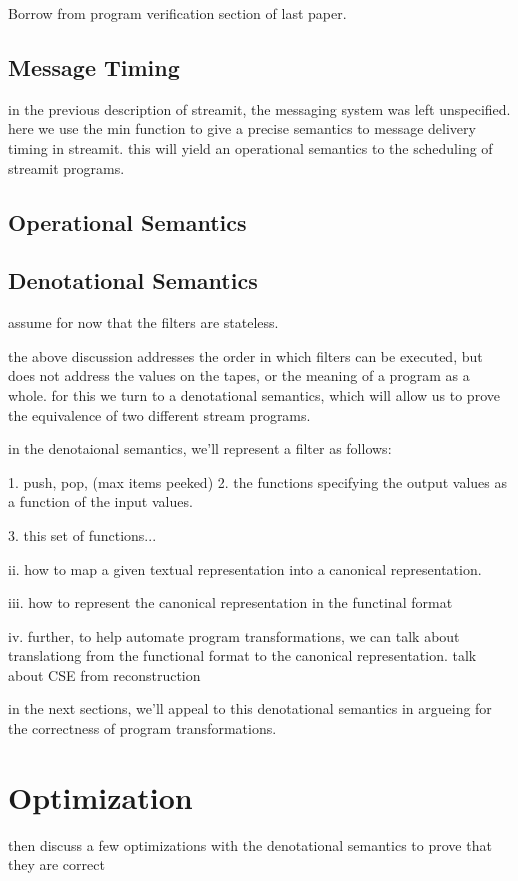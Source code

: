 Borrow from program verification section of last paper. 

\subsection{Message Timing}

in the previous description of streamit, the messaging system was left
unspecified.  here we use the min function to give a precise semantics
to message delivery timing in streamit.  this will yield an
operational semantics to the scheduling of streamit programs.

\subsection{Operational Semantics}

\subsection{Denotational Semantics}

assume for now that the filters are stateless.

the above discussion addresses the order in which filters can be
executed, but does not address the values on the tapes, or the meaning
of a program as a whole.  for this we turn to a denotational
semantics, which will allow us to prove the equivalence of two
different stream programs.

in the denotaional semantics, we'll represent a filter as follows:

1. push, pop, (max items peeked)
2. the functions specifying the output values as a function of the
input values.

3. this set of functions...

ii. how to map a given textual representation into a canonical
representation.

iii. how to represent the canonical representation in the functinal
format

iv. further, to help automate program transformations, we can talk
about translationg from the functional format to the canonical
representation.  talk about CSE from reconstruction

in the next sections, we'll appeal to this denotational semantics in
argueing for the correctness of program transformations.

\section{Optimization}

then discuss a few optimizations with the denotational semantics to
prove that they are correct

